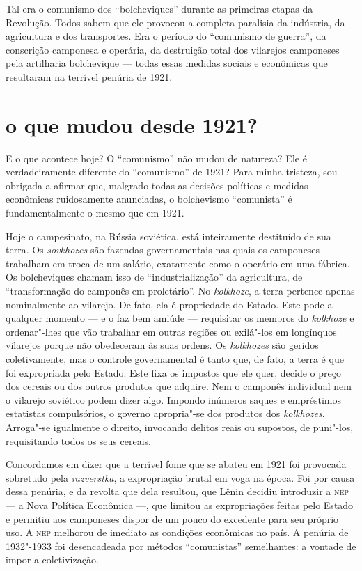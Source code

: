 Tal era o comunismo dos “bolcheviques” durante as primeiras etapas da
Revolução. Todos sabem que ele provocou a completa paralisia da
indústria, da agricultura e dos transportes. Era o período do
“comunismo de guerra”, da conscrição camponesa e operária, da
destruição total dos vilarejos camponeses pela artilharia bolchevique ---
todas essas medidas sociais e econômicas que resultaram na terrível
penúria de 1921.

\section*{o que mudou desde 1921?}
E o que acontece hoje? O “comunismo” não mudou de natureza? Ele é
verdadeiramente diferente do “comunismo” de 1921? Para minha tristeza,
sou obrigada a afirmar que, malgrado todas as decisões políticas e
medidas econômicas ruidosamente anunciadas, o bolchevismo “comunista” é
fundamentalmente o mesmo que em 1921.

Hoje o campesinato, na Rússia soviética, está inteiramente destituído
de sua terra. Os \textit{sovkhozes} são fazendas governamentais nas quais os
camponeses trabalham em troca de um salário, exatamente como o operário
em uma fábrica. Os bolcheviques chamam isso de “industrialização” da
agricultura, de “transformação do camponês em proletário”. No \textit{kolkhoze},
a terra pertence apenas nominalmente ao vilarejo. De fato, ela é
propriedade do Estado. Este pode a qualquer momento --- e o faz bem
amiúde --- requisitar os membros do \textit{kolkhoze} e ordenar"-lhes que vão
trabalhar em outras regiões ou exilá"-los em longínquos vilarejos
porque não obedeceram às suas ordens. Os \textit{kolkhozes} são geridos
coletivamente, mas o controle governamental é tanto que, de fato, a terra é que foi
expropriada pelo Estado. Este fixa os impostos que ele quer,
decide o preço dos cereais ou dos outros produtos que adquire. Nem o
camponês individual nem o vilarejo soviético podem dizer algo. Impondo
inúmeros saques e empréstimos estatistas compulsórios, o governo
apropria"-se dos produtos dos \textit{kolkhozes}. Arroga"-se igualmente o
direito, invocando delitos reais ou supostos, de puni"-los,
requisitando todos os seus cereais.

Concordamos em dizer que a terrível fome que se abateu em 1921 foi
provocada sobretudo pela \textit{razverstka}, a expropriação brutal em voga na
época. Foi por causa dessa penúria, e da revolta que dela resultou, que
Lênin decidiu introduzir a \textsc{nep} --- a Nova Política Econômica ---, que
limitou as expropriações feitas pelo Estado e permitiu aos camponeses
dispor de um pouco do excedente para seu próprio uso. A \textsc{nep} melhorou de
imediato as condições econômicas no país. A penúria de 1932"-1933 foi
desencadeada por métodos “comunistas” semelhantes: a vontade de impor
a coletivização.

